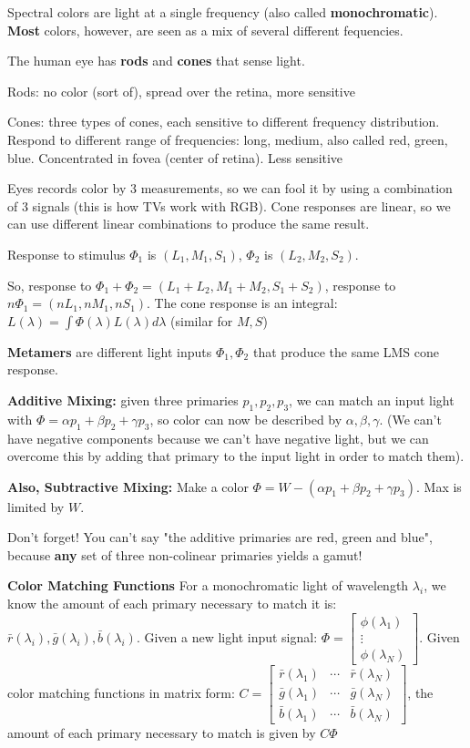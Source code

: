 \documentclass{article}
\begin{document}
Spectral colors are light at a single frequency (also called {\bf monochromatic}). {\bf Most} colors, however, are seen as a mix of several different fequencies.

The human eye has {\bf rods} and {\bf cones} that sense light.

Rods: no color (sort of), spread over the retina, more sensitive

Cones: three types of cones, each sensitive to different frequency distribution. Respond to different range of frequencies: long, medium, also called red, green, blue. Concentrated in fovea (center of retina). Less sensitive

Eyes records color by 3 measurements, so we can fool it by using a combination of 3 signals (this is how TVs work with RGB). Cone responses are linear, so we can use different linear combinations to produce the same result.

Response to stimulus $\Phi_1$ is $(L_1,M_1,S_1)$, $\Phi_2$ is $(L_2,M_2,S_2)$.

So, response to $\Phi_1+\Phi_2 = (L_1+L_2,M_1+M_2,S_1+S_2)$, response to $n\Phi_1 = (nL_1,nM_1,nS_1)$. The cone response is an integral: $L(\lambda)=\int \Phi(\lambda)L(\lambda)d\lambda$ (similar for $M,S$)

{\bf Metamers} are different light inputs $\Phi_1,\Phi_2$ that produce the same LMS cone response.


\textbf{Additive Mixing:}
given three primaries $p_1,p_2,p_3$, we can match an input light with $\Phi=\alpha p_1+\beta p_2 + \gamma p_3$, so color can now be described by $\alpha,\beta,\gamma$. (We can't have negative components because we can't have negative light, but we can overcome this by adding that primary to the input light in order to match them).
\vspace{10pt}

\textbf{Also, Subtractive Mixing:}
Make a color $\Phi=W-(\alpha p_1+\beta p_2 + \gamma p_3)$. Max is limited by $W$.

Don't forget! You can't say "the additive primaries are red, green and blue", because {\bf any} set of three non-colinear primaries yields a gamut!

\textbf{Color Matching Functions}
For a monochromatic light of wavelength $\lambda_i$, we know the amount of each primary necessary to match it is: $\bar{r}(\lambda_i),\bar{g}(\lambda_i),\bar{b}(\lambda_i)$. Given a new light input signal: $\Phi = \begin{bmatrix} \phi(\lambda_1) \\ \vdots \\ \phi(\lambda_N) \end{bmatrix} $. Given color matching functions in matrix form: $C = \begin{bmatrix} \bar{r}(\lambda_1) & \cdots & \bar{r}(\lambda_N) \\ \bar{g}(\lambda_1) & \cdots & \bar{g}(\lambda_N) \\ \bar{b}(\lambda_1) & \cdots & \bar{b}(\lambda_N) \end{bmatrix} $, the amount of each primary necessary to match is given by $C\Phi$
\end{document}
